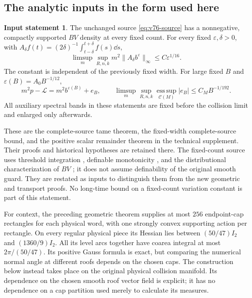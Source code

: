 \documentclass[11pt,reqno]{amsart}
\numberwithin{equation}{section}
\theoremstyle{definition}
\newtheorem{inputstatement}[theorem]{Input statement}
\theoremstyle{remark}\newtheorem{remark}[theorem]{Remark}
\newcommand{\esssup}{\operatorname*{ess\,sup}}
\begin{document}
\subsection{The analytic inputs in the form used here}
\begin{inputstatement}\label{input:v76-analytic}
The unchanged source \eqref{eq:v76-source} has a nonnegative,
compactly supported $BV$ density at every fixed count. For every
fixed $\varepsilon,\delta>0$, with
$A_\delta f(t)=(2\delta)^{-1}\int_{t-\delta}^{t+\delta}f(s)\dd s$,
\begin{equation}\label{eq:v76-average}
 \limsup_m\sup_{R,n,k}m^2\|A_\delta b^\varepsilon\|_\infty
                                      \le C\varepsilon^{1/16}.
\end{equation}
The constant is independent of the previously fixed width. For large
fixed $B$ and $\varepsilon(B)=A_0B^{-1/12}$,
\begin{equation}\label{eq:v76-remainder}
 m^2p-\mathcal L=m^2b^{\varepsilon(B)}+e_B,\qquad
 \limsup_m\sup_{R,n,k}\esssup_{\mathcal C(M)}|e_B|
                                     \le C_MB^{-1/192}.
\end{equation}
All auxiliary spectral bands in these statements are fixed before
the collision limit and enlarged only afterwards.
\end{inputstatement}
These are the complete-source tame theorem, the fixed-width
complete-source bound, and the positive scalar remainder theorem in
the technical supplement. Their proofs and historical hypotheses are
retained there. The fixed-count source uses threshold integration
\cite{CMInt}, definable monotonicity \cite{Coste}, and the
distributional characterization of $BV$ \cite{AFP}; it does not
assume definability of the original smooth guard. They are restated as inputs to distinguish them from
the new geometric and transport proofs. No long-time bound on a
fixed-count variation constant is part of this statement.

For context, the preceding geometric theorem supplies at most $256$
endpoint-cap rectangles for each physical word, with one strongly
convex supporting action per rectangle. On every regular physical
piece its Hessian lies between $(50/47)I_2$ and $(1360/9)I_2$.
All its level arcs together have coarea integral at most
$2\pi/(50/47)$. Its positive Gauss formula is exact, but comparing
the numerical normal angle at different roofs depends on the chosen
caps. The construction below instead takes place on the original
physical collision manifold. Its dependence on the chosen smooth
roof vector field is explicit; it has no dependence on a cap
partition used merely to calculate its measures.
\end{document}
